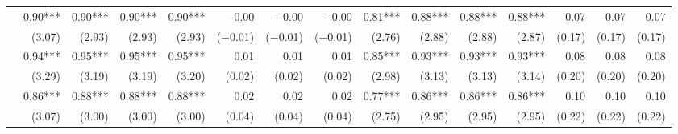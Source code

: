 \begin{tabularx}{1.45\textwidth}{lRRRRRRRRRRRRRR}
		 & \num{0.90}***\phantom{)} & \num{0.90}***\phantom{)} & \num{0.90}***\phantom{)} & \num{0.90}***\phantom{)} & \num{-0.00}\phantom{***)} & \num{-0.00}\phantom{***)} & \num{-0.00}\phantom{***)} & \num{0.81}***\phantom{)} & \num{0.88}***\phantom{)} & \num{0.88}***\phantom{)} & \num{0.88}***\phantom{)} & \num{0.07}\phantom{***)} & \num{0.07}\phantom{***)} & \num{0.07}\phantom{***)} \\
		 & (\num{3.07})\phantom{***} & (\num{2.93})\phantom{***} & (\num{2.93})\phantom{***} & (\num{2.93})\phantom{***} & (\num{-0.01})\phantom{***} & (\num{-0.01})\phantom{***} & (\num{-0.01})\phantom{***} & (\num{2.76})\phantom{***} & (\num{2.88})\phantom{***} & (\num{2.88})\phantom{***} & (\num{2.87})\phantom{***} & (\num{0.17})\phantom{***} & (\num{0.17})\phantom{***} & (\num{0.17})\phantom{***} \\ [\dspacing]
		 & \num{0.94}***\phantom{)} & \num{0.95}***\phantom{)} & \num{0.95}***\phantom{)} & \num{0.95}***\phantom{)} & \num{0.01}\phantom{***)} & \num{0.01}\phantom{***)} & \num{0.01}\phantom{***)} & \num{0.85}***\phantom{)} & \num{0.93}***\phantom{)} & \num{0.93}***\phantom{)} & \num{0.93}***\phantom{)} & \num{0.08}\phantom{***)} & \num{0.08}\phantom{***)} & \num{0.08}\phantom{***)} \\
		 & (\num{3.29})\phantom{***} & (\num{3.19})\phantom{***} & (\num{3.19})\phantom{***} & (\num{3.20})\phantom{***} & (\num{0.02})\phantom{***} & (\num{0.02})\phantom{***} & (\num{0.02})\phantom{***} & (\num{2.98})\phantom{***} & (\num{3.13})\phantom{***} & (\num{3.13})\phantom{***} & (\num{3.14})\phantom{***} & (\num{0.20})\phantom{***} & (\num{0.20})\phantom{***} & (\num{0.20})\phantom{***} \\ [\dspacing]
		 & \num{0.86}***\phantom{)} & \num{0.88}***\phantom{)} & \num{0.88}***\phantom{)} & \num{0.88}***\phantom{)} & \num{0.02}\phantom{***)} & \num{0.02}\phantom{***)} & \num{0.02}\phantom{***)} & \num{0.77}***\phantom{)} & \num{0.86}***\phantom{)} & \num{0.86}***\phantom{)} & \num{0.86}***\phantom{)} & \num{0.10}\phantom{***)} & \num{0.10}\phantom{***)} & \num{0.10}\phantom{***)} \\
		 & (\num{3.07})\phantom{***} & (\num{3.00})\phantom{***} & (\num{3.00})\phantom{***} & (\num{3.00})\phantom{***} & (\num{0.04})\phantom{***} & (\num{0.04})\phantom{***} & (\num{0.04})\phantom{***} & (\num{2.75})\phantom{***} & (\num{2.95})\phantom{***} & (\num{2.95})\phantom{***} & (\num{2.95})\phantom{***} & (\num{0.22})\phantom{***} & (\num{0.22})\phantom{***} & (\num{0.22})\phantom{***} \\ [\dspacing]

\end{tabularx}

